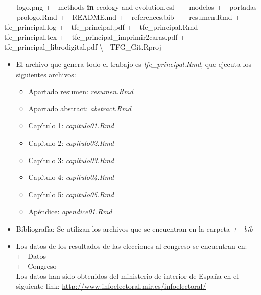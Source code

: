 \documentclass[12pt,a4paper,]{book}
\newenvironment{Shaded}{\begin{snugshade}}{\end{snugshade}}
\newcommand{\ControlFlowTok}[1]{\textcolor[rgb]{0.13,0.29,0.53}{\textbf{#1}}}
\newcommand{\NormalTok}[1]{#1}
\newcommand{\SpecialCharTok}[1]{\textcolor[rgb]{0.00,0.00,0.00}{#1}}
\providecommand{\tightlist}{%
  \setlength{\itemsep}{0pt}\setlength{\parskip}{0pt}}
\numberwithin{dummy}{section}
\theoremstyle{ocrenumbox}
\theoremstyle{blacknumex}
\theoremstyle{blacknumbox}
\theoremstyle{ocrenum}
\theoremstyle{ocrenum}
\begin{document}
\begin{Shaded}
\begin{Highlighting}[]
\SpecialCharTok{+{-}{-}}\NormalTok{ logo.png}
\SpecialCharTok{+{-}{-}}\NormalTok{ methods}\SpecialCharTok{{-}}\ControlFlowTok{in}\SpecialCharTok{{-}}\NormalTok{ecology}\SpecialCharTok{{-}}\NormalTok{and}\SpecialCharTok{{-}}\NormalTok{evolution.csl}
\SpecialCharTok{+{-}{-}}\NormalTok{ modelos}
\SpecialCharTok{+{-}{-}}\NormalTok{ portadas}
\SpecialCharTok{+{-}{-}}\NormalTok{ prologo.Rmd}
\SpecialCharTok{+{-}{-}}\NormalTok{ README.md}
\SpecialCharTok{+{-}{-}}\NormalTok{ references.bib}
\SpecialCharTok{+{-}{-}}\NormalTok{ resumen.Rmd}
\SpecialCharTok{+{-}{-}}\NormalTok{ tfe\_principal.log}
\SpecialCharTok{+{-}{-}}\NormalTok{ tfe\_principal.pdf}
\SpecialCharTok{+{-}{-}}\NormalTok{ tfe\_principal.Rmd}
\SpecialCharTok{+{-}{-}}\NormalTok{ tfe\_principal.tex}
\SpecialCharTok{+{-}{-}}\NormalTok{ tfe\_principal\_imprimir2caras.pdf}
\SpecialCharTok{+{-}{-}}\NormalTok{ tfe\_principal\_librodigital.pdf}
\NormalTok{\textbackslash{}}\SpecialCharTok{{-}{-}}\NormalTok{ TFG\_Git.Rproj}
\end{Highlighting}
\end{Shaded}

\begin{itemize}
\item
  El archivo que genera todo el trabajo es \emph{tfe\_principal.Rmd},
  que ejecuta los siguientes archivos:

  \begin{itemize}
  \tightlist
  \item
    Apartado resumen: \emph{resumen.Rmd}
  \item
    Apartado abstract: \emph{abstract.Rmd}
  \item
    Capítulo 1: \emph{capitulo01.Rmd}
  \item
    Capítulo 2: \emph{capitulo02.Rmd}
  \item
    Capítulo 3: \emph{capitulo03.Rmd}
  \item
    Capítulo 4: \emph{capitulo04.Rmd}
  \item
    Capítulo 5: \emph{capitulo05.Rmd}
  \item
    Apéndice: \emph{apendice01.Rmd}
  \end{itemize}
\item
  Bibliografía: Se utilizan los archivos que se encuentran en la carpeta
  \emph{+-- bib}
\item
  Los datos de los resultados de las elecciones al congreso se
  encuentran en:\\
  +-- Datos\\
  \textbar{} +-- Congreso\\
  Los datos han sido obtenidos del ministerio de interior de España en
  el siguiente link:
  \url{http://www.infoelectoral.mir.es/infoelectoral/}
\end{itemize}
\end{document}
